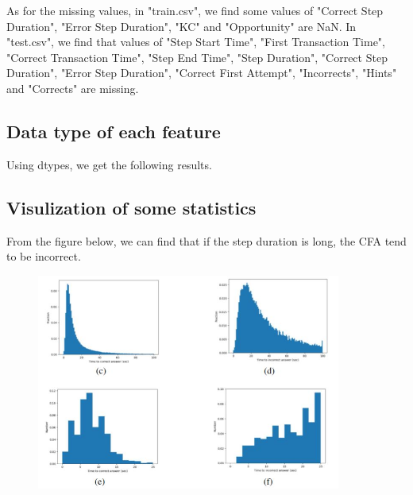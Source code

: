 \documentclass{article}
\begin{document}
As for the missing values, in "train.csv", we find some values of "Correct Step Duration", "Error Step Duration", "KC" and "Opportunity" are NaN. In "test.csv", we find that values of "Step Start Time", "First Transaction
Time", "Correct Transaction Time", "Step End Time", "Step Duration", "Correct Step Duration", "Error Step Duration", "Correct First Attempt", "Incorrects", "Hints" and "Corrects" are missing.
\subsection{Data type of each feature}
\quad Using dtypes, we get the following results.
\begin{figure}[h]
	\centering
\end{figure}
\subsection{Visulization of some statistics}
From the figure below, we can find that if the step duration is long, the CFA tend to be incorrect.
\begin{figure}[h]
	\centering
	{\includegraphics[width=10cm]{5.JPG}}
\end{figure}
\end{document}
